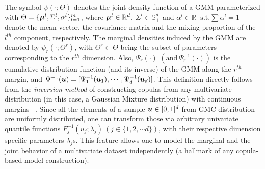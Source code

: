 \documentclass{article}
\theoremstyle{plain}
\theoremstyle{definition}
\theoremstyle{remark}
\begin{document}
The symbol $\psi(\cdot;\Theta)$ denotes the joint density function of a GMM parameterized with $\Theta = \{\boldsymbol{\mu}^l, \Sigma^l, \alpha^l\}_{l=1}^m$, where $\boldsymbol{\mu}^l \in \mathbb{R}^d$, $\Sigma^l \in \mathbb{S}_+^d$ and $\alpha^l \in \mathbb{R}_+ \text{s.t.} \sum \alpha^l=1$ denote the mean vector, the covariance matrix and the mixing proportion of the $l^{th}$ component, respectively. The marginal densities induced by the GMM are denoted by $\psi_r(\cdot;\Theta^r)$, with $\Theta^r\subset \Theta$ being the subset of parameters corresponding to the $r^{th}$ dimension. Also, $\Psi_r(\cdot)$ $\left(\text{and} \ \Psi^{-1}_r(\cdot) \right)$ is the cumulative distribution function (and its inverse) of the GMM along the $r^{th}$ margin, and $\Psi^{-1}(\boldsymbol{u})=[\Psi^{-1}_1(\boldsymbol{u}_1), \cdots, \Psi^{-1}_d(\boldsymbol{u}_d)]$. This definition directly follows from the \emph{inversion method} of constructing copulas from any multivariate distribution (in this case, a Gaussian Mixture distribution) with continuous margins ~\citep[see][chapter 3]{Nelsen1999Chapter3}. Since all the elements of a sample $\boldsymbol{u}\in [0,1]^d$ from GMC distribution are uniformly distributed, one can transform those via arbitrary univariate quantile functions $F_j^{-1}(u_j;\lambda_j) \ (j\in \{1,2,\cdots d\} )$, with their respective dimension specific parameters $\lambda_j$s. This feature allows one to model the marginal and the joint behavior of a multivariate dataset independently (a hallmark of any copula-based model construction).
\end{document}
